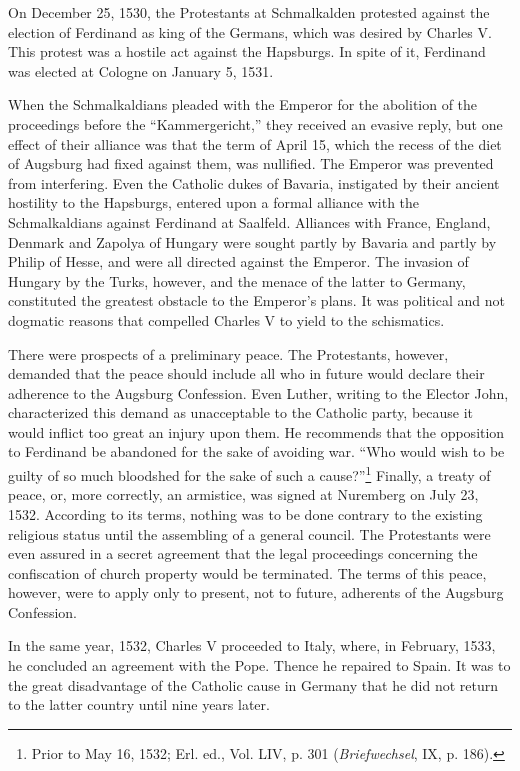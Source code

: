 On December 25, 1530, the Protestants at Schmalkalden protested
against the election of Ferdinand as king of the Germans, which
was desired by Charles V. This protest was a hostile act against the
Hapsburgs. In spite of it, Ferdinand was elected at Cologne on
January 5, 1531.

When the Schmalkaldians pleaded with the Emperor for the
abolition of the proceedings before the “Kammergericht,” they received
an evasive reply, but one effect of their alliance was that
the term of April 15, which the recess of the diet of Augsburg had
fixed against them, was nullified. The Emperor was prevented from
interfering. Even the Catholic dukes of Bavaria, instigated by their
ancient hostility to the Hapsburgs, entered upon a formal alliance
with the Schmalkaldians against Ferdinand at Saalfeld. Alliances
with France, England, Denmark and Zapolya of Hungary were
sought partly by Bavaria and partly by Philip of Hesse, and were
all directed against the Emperor. The invasion of Hungary by the
Turks, however, and the menace of the latter to Germany, constituted
the greatest obstacle to the Emperor’s plans. It was political
and not dogmatic reasons that compelled Charles V to yield to the
schismatics.

There were prospects of a preliminary peace. The Protestants,
however, demanded that the peace should include all who in future
would declare their adherence to the Augsburg Confession. Even
Luther, writing to the Elector John, characterized this demand as
unacceptable to the Catholic party, because it would inflict too great
an injury upon them. He recommends that the opposition to Ferdinand
be abandoned for the sake of avoiding war. “Who would wish to
be guilty of so much bloodshed for the sake of such a cause?”\footnote
{Prior to May 16, 1532; Erl. ed., Vol. LIV, p. 301 (\textit{Briefwechsel}, IX, p. 186).}
Finally, a treaty of peace, or, more correctly, an armistice, was
signed at Nuremberg on July 23, 1532. According to its terms,
nothing was to be done contrary to the existing religious status
until the assembling of a general council. The Protestants were even
assured in a secret agreement that the legal proceedings concerning
the confiscation of church property would be terminated. The terms
of this peace, however, were to apply only to present, not to future,
adherents of the Augsburg Confession.

In the same year, 1532, Charles V proceeded to Italy, where, in
February, 1533, he concluded an agreement with the Pope. Thence
he repaired to Spain. It was to the great disadvantage of the Catholic
cause in Germany that he did not return to the latter country until
nine years later.

